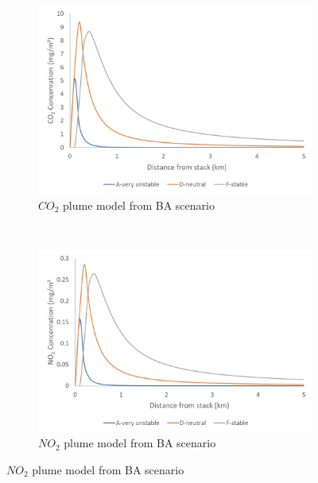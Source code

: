 \begin{figure}[t!]
    \centering
    \begin{subfigure}[t]{0.5\textwidth}
        \centering
        \includegraphics[width=\linewidth]{figures/CO2plumeBA.jpg}
        \caption{$CO_2$ plume model from BA scenario}
         \label{fig:CO2plumeBA}
    \end{subfigure}%
    
    ~ 
    \begin{subfigure}[t]{0.5\textwidth}
        \centering
        \includegraphics[width=\linewidth]{figures/NO2plumeBA.jpg}
        \caption{$NO_2$ plume model from BA scenario}
         \label{fig:NO2plumeBA}
    \end{subfigure}
\end{figure}


